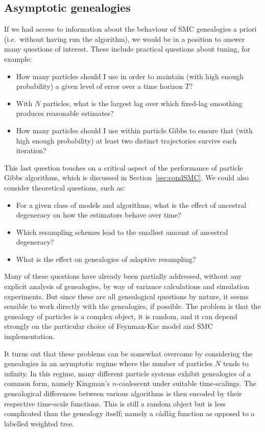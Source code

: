 \subsection{Asymptotic genealogies}
If we had access to information about the behaviour of SMC genealogies a priori (i.e.\ without having run the algorithm), we would be in a position to answer many questions of interest. These include practical questions about tuning, for example:
\begin{itemize}
\item How many particles should I use in order to maintain (with high enough probability) a given level of error over a time horizon $T$?
\item With $N$ particles, what is the largest lag over which fixed-lag smoothing produces reasonable estimates?
\item How many particles should I use within particle Gibbs to ensure that (with high enough probability) at least two distinct trajectories survive each iteration?
\end{itemize}
This last question touches on a critical aspect of the performance of particle Gibbs algorithms, which is discussed in Section~\ref{sec:condSMC}.
We could also consider theoretical questions, such as:
\begin{itemize}
\item For a given class of models and algorithms, what is the effect of ancestral degeneracy on how the estimators behave over time?
\item Which resampling schemes lead to the smallest amount of ancestral degeneracy?
\item What is the effect on genealogies of adaptive resampling?
\end{itemize}
Many of these questions have already been partially addressed, without any explicit analysis of genealogies, by way of variance calculations and simulation experiments.
But since these are all genealogical questions by nature, it seems sensible to work directly with the genealogies, if possible.
The problem is that the genealogy of particles is a complex object, it is random, and it can depend strongly on the particular choice of Feynman-Kac model and SMC implementation.

It turns out that these problems can be somewhat overcome by considering the genealogies in an asymptotic regime where the number of particles $N$ tends to infinity.
In this regime, many different particle systems exhibit genealogies of a common form, namely Kingman's $n$-coalescent under suitable time-scalings. The genealogical differences between various algorithms is then encoded by their respective time-scale functions. This is still a random object but is less complicated than the genealogy itself; namely a c\`adl\`ag function as opposed to a labelled weighted tree.

